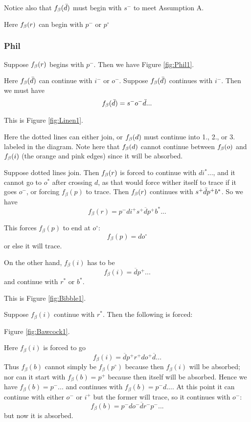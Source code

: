 Notice also that $f_\beta(\bar{d})$ must begin with $s^-$ to meet Assumption A.

Here $f_\beta(r)$ can begin with $p^-$ or $p^\circ$
\subsubsection{Phil} \label{Phil}
Suppose $f_\beta(r)$ begins with $p^-$. Then we have Figure \ref{fig:Phil1}.

Here $f_\beta(\bar{d})$ can continue with $i^-$ or $o^-$.
 \label{Linen}
Suppose $f_\beta(\bar{d})$ continues with $i^-$. Then we must have
\[
f_\beta(\bar{d}) = s^- o^- \bar{d}...
\]

This is Figure \ref{fig:Linen1}.

Here the dotted lines can either join, or $f_\beta(d)$ must continue into 1., 2., or 3. labeled in the diagram. Note here that $f_\beta(d)$ cannot continue between $f_\beta(o)$ and $f_\beta(i)$ (the orange and pink edges) since it will be absorbed.

\label{Bibble}
Suppose dotted lines join. Then $f_\beta(r)$ is forced to continue with $di^*...$, and it cannot go to $o^*$ after crossing $d$, as that would force wither itself to trace if it goes $o^-$, or forcing $f_\beta(p)$ to trace. Then $f_\beta(r)$ continues with $s^+ \bar{d} p^+b^*$. So we have 
\[
f_\beta(r) = p^-di^+s^+\overline{d}p^+b^*...
\]

This forces $f_\beta(p)$ to end at $o^\circ$:
\[
f_\beta(p) = do^\circ
\]
or else it will trace. 

On the other hand, $f_\beta(i)$ has to be
\[
f_\beta(i) = \overline{d}p^+...
\]
and continue with $r^*$ or $b^*$.

This is Figure \ref{fig:Bibble1}.

\label{Bawcock}
Suppose $f_\beta(i)$ continue with $r^*$. Then the following is forced:

Figure \ref{fig:Bawcock1}.

Here $f_\beta(i)$ is forced to go
\[
f_\beta(i) = \overline{d}p^+r^+do^+\overline{d}...
\]
Thus $f_\beta(b)$ cannot simply be $f_\beta(p^\circ)$ because then $f_\beta(i)$ will be absorbed; nor can it start with $f_\beta(b) = p^+$ because then itself will be absorbed. Hence we have $f_\beta(b) = p^-...$ and continues with $f_\beta(b) = p^-d...$. At this point it can continue with either $o^-$ or $i^+$ but the former will trace, so it continues with $o^-$:
\[
f_\beta(b) = p^-do^-\overline{d}r^-p^-...
\]
but now it is absorbed. 


